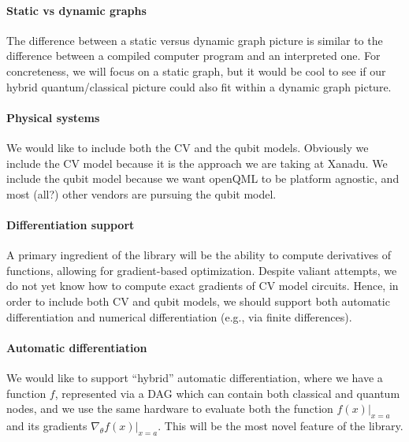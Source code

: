 \documentclass[a4paper,10pt]{article}
\begin{document}
\paragraph{Static vs dynamic graphs}
The difference between a static versus dynamic graph picture is similar to the difference between a compiled computer program and an interpreted one. For concreteness, we will focus on a static graph, but it would be cool to see if our hybrid quantum/classical picture could also fit within a dynamic graph picture. 

\paragraph{Physical systems}
We would like to include both the CV and the qubit models. Obviously we include the CV model because it is the approach we are taking at Xanadu. We include the qubit model because we want openQML to be platform agnostic, and most (all?) other vendors are pursuing the qubit model.

\paragraph{Differentiation support} 
A primary ingredient of the library will be the ability to compute derivatives of functions, allowing for gradient-based optimization. Despite valiant attempts, we do not yet know how to compute exact gradients of CV model circuits. Hence, in order to include both CV and qubit models, we should support both automatic differentiation and numerical differentiation (e.g., via finite differences).

\paragraph{Automatic differentiation}
We would like to support ``hybrid'' automatic differentiation, where we have a function $f$, represented via a DAG which can contain both classical and quantum nodes, and we use the same hardware to evaluate both the function $f(x)\big|_{x=a}$ and its gradients $\nabla_\theta f(x)\big|_{x=a}$. This will be the most novel feature of the library.
\end{document}

